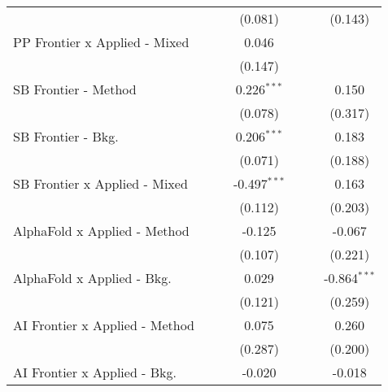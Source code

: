 \begin{tabular}{lcccccc}
                                  &                &                & (0.081)        &               &         & (0.143)\\   
   PP Frontier x Applied - Mixed  &                &                & 0.046          &               &         &   \\   
                                  &                &                & (0.147)        &               &         &   \\   
   SB Frontier - Method           &                &                & 0.226$^{***}$  &               &         & 0.150\\   
                                  &                &                & (0.078)        &               &         & (0.317)\\   
   SB Frontier - Bkg.             &                &                & 0.206$^{***}$  &               &         & 0.183\\   
                                  &                &                & (0.071)        &               &         & (0.188)\\   
   SB Frontier x Applied - Mixed  &                &                & -0.497$^{***}$ &               &         & 0.163\\   
                                  &                &                & (0.112)        &               &         & (0.203)\\   
   AlphaFold x Applied - Method   &                &                & -0.125         &               &         & -0.067\\   
                                  &                &                & (0.107)        &               &         & (0.221)\\   
   AlphaFold x Applied - Bkg.     &                &                & 0.029          &               &         & -0.864$^{***}$\\   
                                  &                &                & (0.121)        &               &         & (0.259)\\   
   AI Frontier x Applied - Method &                &                & 0.075          &               &         & 0.260\\   
                                  &                &                & (0.287)        &               &         & (0.200)\\   
   AI Frontier x Applied - Bkg.   &                &                & -0.020         &               &         & -0.018\\   

\end{tabular}
